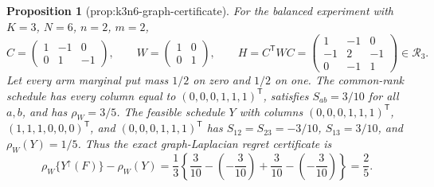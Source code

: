 \documentclass{article}
\newtheorem{proposition}{Proposition}
\begin{document}
\begin{proposition}[prop:k3n6-graph-certificate]\label{prop:k3n6-graph-certificate}
For the balanced experiment with \(K=3\), \(N=6\), \(n=2\), \(m=2\), \[C=\begin{pmatrix}1&-1&0\\0&1&-1\end{pmatrix},\qquad W=\begin{pmatrix}1&0\\0&1\end{pmatrix},\qquad H=C^{\mathsf T}WC=\begin{pmatrix}1&-1&0\\-1&2&-1\\0&-1&1\end{pmatrix}\in\mathcal R_3.\] Let every arm marginal put mass \(1/2\) on zero and \(1/2\) on one. The common-rank schedule has every column equal to \((0,0,0,1,1,1)^{\mathsf T}\), satisfies \(S_{ab}=3/10\) for all \(a,b\), and has \(\rho_W=3/5\). The feasible schedule \(Y\) with columns \((0,0,0,1,1,1)^{\mathsf T}\), \((1,1,1,0,0,0)^{\mathsf T}\), and \((0,0,0,1,1,1)^{\mathsf T}\) has \(S_{12}=S_{23}=-3/10\), \(S_{13}=3/10\), and \(\rho_W(Y)=1/5\). Thus the exact graph-Laplacian regret certificate is \[\rho_W\{Y^{\uparrow}(F)\}-\rho_W(Y)=\frac{1}{3}\left\{\frac{3}{10}-\left(-\frac{3}{10}\right)+\frac{3}{10}-\left(-\frac{3}{10}\right)\right\}=\frac{2}{5}.\]
\end{proposition}
\end{document}
